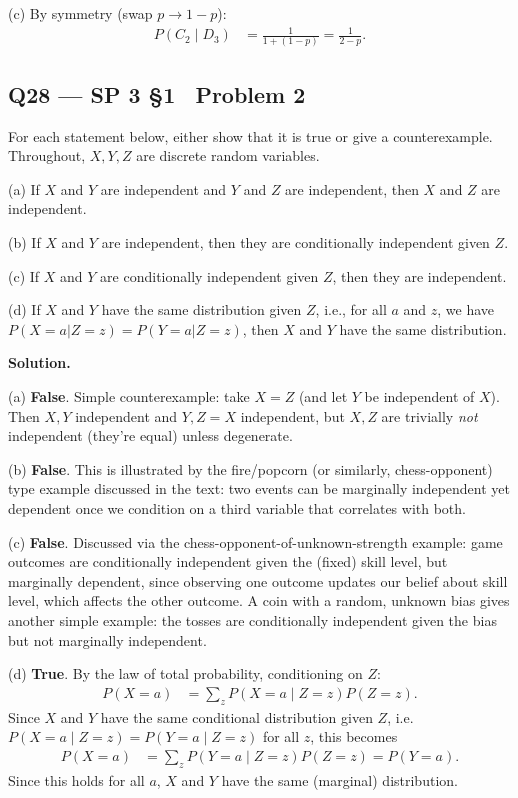 \documentclass[11pt]{article}
\begin{document}
(c) By symmetry (swap $p \to 1-p$):
\begin{align*}
P(C_2\mid D_3) &= \frac{1}{1+(1-p)} = \frac{1}{2-p}.
\end{align*}

\subsection*{Q28 --- SP 3 \S1 \textperiodcentered\ Problem 2}
\begin{qbox}
For each statement below, either show that it is true or give a counterexample. Throughout, $X, Y, Z$ are discrete random variables.

(a) If $X$ and $Y$ are independent and $Y$ and $Z$ are independent, then $X$ and $Z$ are independent.

(b) If $X$ and $Y$ are independent, then they are conditionally independent given $Z$.

(c) If $X$ and $Y$ are conditionally independent given $Z$, then they are independent.

(d) If $X$ and $Y$ have the same distribution given $Z$, i.e., for all $a$ and $z$, we have $P(X = a|Z = z) = P(Y = a|Z = z)$, then $X$ and $Y$ have the same distribution.
\end{qbox}
\textbf{Solution.}

(a) \textbf{False}. Simple counterexample: take $X=Z$ (and let $Y$ be independent of $X$). Then $X,Y$ independent and $Y,Z=X$ independent, but $X,Z$ are trivially \emph{not} independent (they're equal) unless degenerate.

(b) \textbf{False}. This is illustrated by the fire/popcorn (or similarly, chess-opponent) type example discussed in the text: two events can be marginally independent yet dependent once we condition on a third variable that correlates with both.

(c) \textbf{False}. Discussed via the chess-opponent-of-unknown-strength example: game outcomes are conditionally independent given the (fixed) skill level, but marginally dependent, since observing one outcome updates our belief about skill level, which affects the other outcome. A coin with a random, unknown bias gives another simple example: the tosses are conditionally independent given the bias but not marginally independent.

(d) \textbf{True}. By the law of total probability, conditioning on $Z$:
\begin{align*}
P(X=a) &= \sum_z P(X=a\mid Z=z)P(Z=z).
\end{align*}
Since $X$ and $Y$ have the same conditional distribution given $Z$, i.e. $P(X=a\mid Z=z)=P(Y=a\mid Z=z)$ for all $z$, this becomes
\begin{align*}
P(X=a) &= \sum_z P(Y=a\mid Z=z)P(Z=z) = P(Y=a).
\end{align*}
Since this holds for all $a$, $X$ and $Y$ have the same (marginal) distribution.
\end{document}
